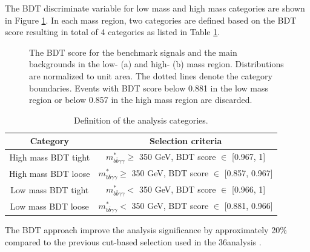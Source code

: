 The BDT discriminate variable for low mass and high mass categories are shown in Figure \ref{fig:HHyybb:ObjEvt:Evt:dBDT}. In each mass region, two categories are defined based on the BDT score resulting in total of 4 categories as listed in Table \ref{tab:HHyybb:ObjEvt:Evt:Cat}.

\begin{figure}[ht]
    \centering
    \caption{The BDT score for the benchmark signals and the main backgrounds in the low- (a) and high- (b) mass region. Distributions are normalized to unit area. The dotted lines denote the category boundaries. Events with BDT score below 0.881 in the low mass region or below 0.857 in the high mass region are discarded.}
    \label{fig:HHyybb:ObjEvt:Evt:dBDT}
\end{figure}

\begin{table}[ht]
    \centering
    \begin{tabular}{cc}
    \hline\hline
        Category & Selection criteria \\
    \hline
    High mass BDT tight & $m_{b \bar{b} \gamma \gamma}^{*} \geq$ 350 GeV, BDT score $\in$ [0.967, 1] \\
    High mass BDT loose & $m_{b \bar{b} \gamma \gamma}^{*} \geq$ 350 GeV, BDT score $\in$ [0.857, 0.967] \\
    Low mass BDT tight & $m_{b \bar{b} \gamma \gamma}^{*} <$ 350 GeV, BDT score $\in$ [0.966, 1] \\
    Low mass BDT loose & $m_{b \bar{b} \gamma \gamma}^{*} <$ 350 GeV, BDT score $\in$ [0.881, 0.966] \\
     \hline\hline
    \end{tabular}
    \caption{Definition of the analysis categories.}
    \label{tab:HHyybb:ObjEvt:Evt:Cat}
\end{table}
The BDT approach improve the analysis significance by approximately 20\% compared to the previous cut-based selection used in the 36\ifb analysis \cite{yybb_36ifb}.  

